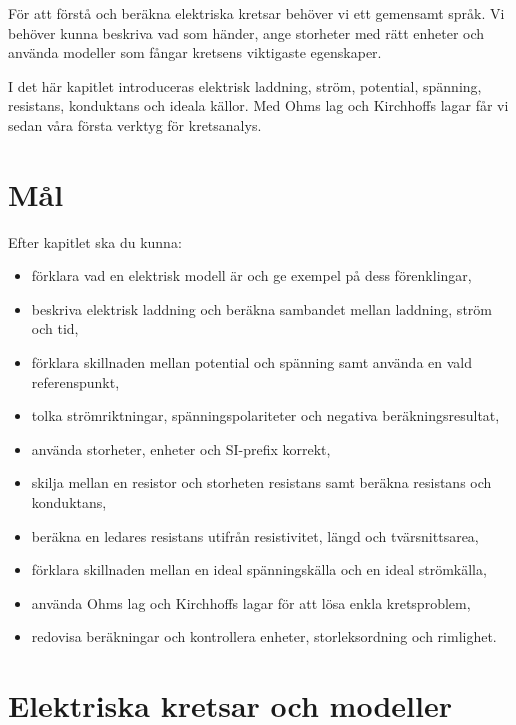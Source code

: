 \documentclass[
  swedish,
  11pt,
  a4paper,
  DIV=11,
  numbers=noendperiod,
  twoside,
  open=any]{scrreprt}
\providecommand{\tightlist}{%
  \setlength{\itemsep}{0pt}\setlength{\parskip}{0pt}}
\begin{document}
För att förstå och beräkna elektriska kretsar behöver vi ett gemensamt
språk. Vi behöver kunna beskriva vad som händer, ange storheter med rätt
enheter och använda modeller som fångar kretsens viktigaste egenskaper.

I det här kapitlet introduceras elektrisk laddning, ström, potential,
spänning, resistans, konduktans och ideala källor. Med Ohms lag och
Kirchhoffs lagar får vi sedan våra första verktyg för kretsanalys.

\section*{Mål}\label{sec-grunder-mal}


Efter kapitlet ska du kunna:

\begin{itemize}
\tightlist
\item
  förklara vad en elektrisk modell är och ge exempel på dess
  förenklingar,
\item
  beskriva elektrisk laddning och beräkna sambandet mellan laddning,
  ström och tid,
\item
  förklara skillnaden mellan potential och spänning samt använda en vald
  referenspunkt,
\item
  tolka strömriktningar, spänningspolariteter och negativa
  beräkningsresultat,
\item
  använda storheter, enheter och SI-prefix korrekt,
\item
  skilja mellan en resistor och storheten resistans samt beräkna
  resistans och konduktans,
\item
  beräkna en ledares resistans utifrån resistivitet, längd och
  tvärsnittsarea,
\item
  förklara skillnaden mellan en ideal spänningskälla och en ideal
  strömkälla,
\item
  använda Ohms lag och Kirchhoffs lagar för att lösa enkla kretsproblem,
\item
  redovisa beräkningar och kontrollera enheter, storleksordning och
  rimlighet.
\end{itemize}

\section{Elektriska kretsar och
modeller}\label{sec-grunder-elektriska-kretsar-och-modeller}
\end{document}
